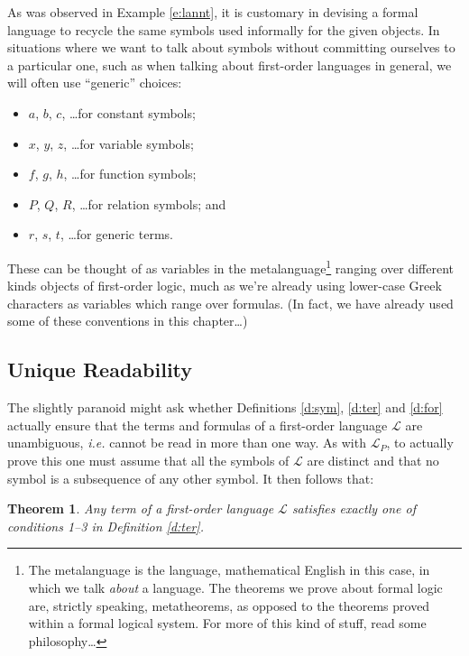 \documentclass[12pt]{amsbook}
\theoremstyle{plain}
\newtheorem{thm}{Theorem}[chapter]
\theoremstyle{definition}
\theoremstyle{remark}
\begin{document}
As was observed in Example \ref{e:lannt},  it is customary in devising a formal language to recycle the same symbols used informally for the given objects.  In situations where we want to talk about symbols without committing ourselves to a particular one,  such as when talking about first-order languages in general,  we will often use ``generic'' choices:
\begin{itemize}
\item $a$,  $b$,  $c$, \dots  for constant symbols;
\item $x$, $y$, $z$, \dots for variable symbols;
\item $f$,  $g$,  $h$, \dots for function symbols;
\item $P$, $Q$, $R$,  \dots for relation symbols;  and 
\item $r$, $s$, $t$, \dots for generic terms.
\end{itemize}
These can be thought of as variables in the metalanguage\footnote{The metalanguage is the language,   mathematical English in this case,  in which we talk {\em about\/} a language.  The theorems we prove about formal logic are,  strictly speaking,  metatheorems,  as opposed to the theorems proved within a formal logical system.  For more of this kind of stuff,  read some philosophy\dots} ranging over different kinds objects of first-order logic,  much as we're already using lower-case Greek characters as variables which range over formulas.  (In fact,  we have already used some of these conventions in this chapter\dots)


\subsection*{Unique Readability}

The slightly paranoid might ask whether Definitions \ref{d:sym},  \ref{d:ter} and \ref{d:for} actually ensure that the terms and formulas of a first-order language $\mathcal{L}$ are unambiguous,  {\em i.e.\/} cannot be read in more than one way.  As with $\mathcal{L}_P$,  to actually prove this one must assume that all the symbols of $\mathcal{L}$ are distinct and that no symbol is a subsequence of any other symbol.  It then follows that:

\begin{thm} \label{t:urt} 
Any term of a first-order language $\mathcal{L}$ satisfies exactly one of conditions 1--3 in Definition \ref{d:ter}.
\end{thm}
\end{document}

